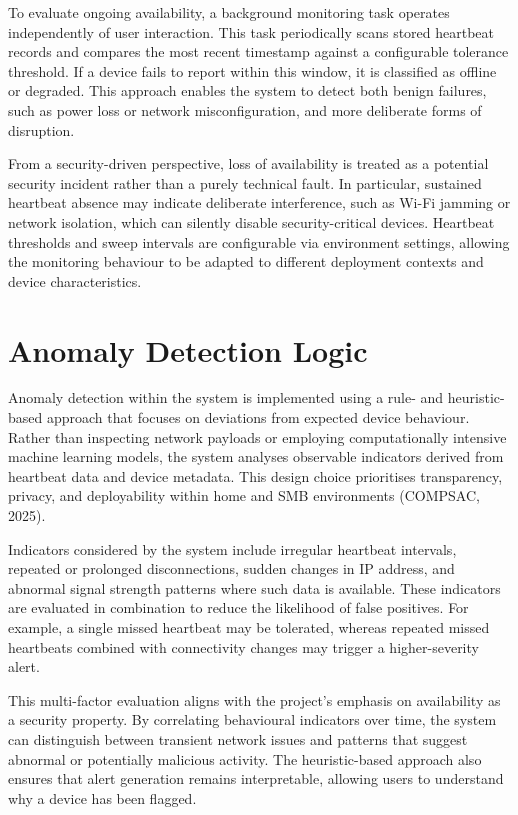 To evaluate ongoing availability, a background monitoring task operates independently of user interaction. This task periodically scans stored heartbeat records and compares the most recent timestamp against a configurable tolerance threshold. If a device fails to report within this window, it is classified as offline or degraded. This approach enables the system to detect both benign failures, such as power loss or network misconfiguration, and more deliberate forms of disruption.

From a security-driven perspective, loss of availability is treated as a potential security incident rather than a purely technical fault. In particular, sustained heartbeat absence may indicate deliberate interference, such as Wi-Fi jamming or network isolation, which can silently disable security-critical devices. Heartbeat thresholds and sweep intervals are configurable via environment settings, allowing the monitoring behaviour to be adapted to different deployment contexts and device characteristics.

\section{Anomaly Detection Logic}

Anomaly detection within the system is implemented using a rule- and heuristic-based approach that focuses on deviations from expected device behaviour. Rather than inspecting network payloads or employing computationally intensive machine learning models, the system analyses observable indicators derived from heartbeat data and device metadata. This design choice prioritises transparency, privacy, and deployability within home and SMB environments (COMPSAC, 2025).

Indicators considered by the system include irregular heartbeat intervals, repeated or prolonged disconnections, sudden changes in IP address, and abnormal signal strength patterns where such data is available. These indicators are evaluated in combination to reduce the likelihood of false positives. For example, a single missed heartbeat may be tolerated, whereas repeated missed heartbeats combined with connectivity changes may trigger a higher-severity alert.

This multi-factor evaluation aligns with the project's emphasis on availability as a security property. By correlating behavioural indicators over time, the system can distinguish between transient network issues and patterns that suggest abnormal or potentially malicious activity. The heuristic-based approach also ensures that alert generation remains interpretable, allowing users to understand why a device has been flagged.

